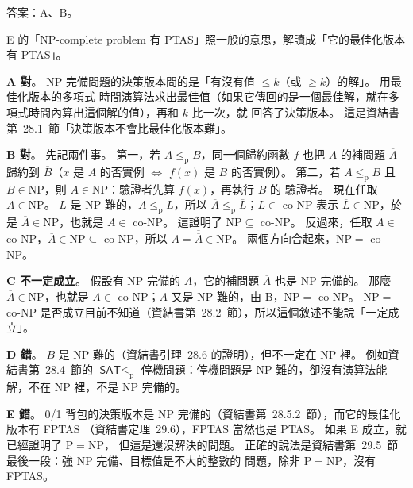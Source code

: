 \begin{pastsoln}
答案：A、B。

E 的「NP-complete problem 有 PTAS」照一般的意思，解讀成「它的最佳化版本有 PTAS」。

\textbf{A 對}。 NP 完備問題的決策版本問的是「有沒有值 $\le k$（或 $\ge k$）的解」。 用最佳化版本的多項式
時間演算法求出最佳值（如果它傳回的是一個最佳解，就在多項式時間內算出這個解的值），再和 $k$ 比一次，就
回答了決策版本。 這是資結書第~28.1~節「決策版本不會比最佳化版本難」。

\textbf{B 對}。 先記兩件事。 第一，若 $A \le_{\mathrm{p}} B$，同一個歸約函數 $f$ 也把 $A$ 的補問題
$\overline{A}$ 歸約到 $\overline{B}$（$x$ 是 $A$ 的否實例 $\iff$ $f(x)$ 是 $B$ 的否實例）。 第二，若
$A \le_{\mathrm{p}} B$ 且 $B \in \mathrm{NP}$，則 $A \in \mathrm{NP}$：驗證者先算 $f(x)$，再執行 $B$ 的
驗證者。 現在任取 $A \in \mathrm{NP}$。 $L$ 是 NP 難的，$A \le_{\mathrm{p}} L$，所以
$\overline{A} \le_{\mathrm{p}} \overline{L}$；$L \in$ co-NP 表示 $\overline{L} \in \mathrm{NP}$，於是
$\overline{A} \in \mathrm{NP}$，也就是 $A \in$ co-NP。 這證明了 $\mathrm{NP} \subseteq$ co-NP。
反過來，任取 $A \in$ co-NP，$\overline{A} \in \mathrm{NP} \subseteq$ co-NP，所以
$A = \overline{\overline{A}} \in \mathrm{NP}$。 兩個方向合起來，$\mathrm{NP} =$ co-NP。

\textbf{C 不一定成立}。 假設有 NP 完備的 $A$，它的補問題 $\overline{A}$ 也是 NP 完備的。 那麼
$\overline{A} \in \mathrm{NP}$，也就是 $A \in$ co-NP；$A$ 又是 NP 難的，由 B，$\mathrm{NP} =$ co-NP。
$\mathrm{NP} =$ co-NP 是否成立目前不知道（資結書第~28.2~節），所以這個敘述不能說「一定成立」。

\textbf{D 錯}。 $B$ 是 NP 難的（資結書引理~28.6 的證明），但不一定在 NP 裡。 例如資結書第~28.4~節的
$\textsf{SAT} \le_{\mathrm{p}}$ 停機問題：停機問題是 NP 難的，卻沒有演算法能解，不在 NP 裡，不是
NP 完備的。

\textbf{E 錯}。 0/1 背包的決策版本是 NP 完備的（資結書第~28.5.2~節），而它的最佳化版本有 FPTAS
（資結書定理~29.6），FPTAS 當然也是 PTAS。 如果 E 成立，就已經證明了 $\mathrm{P} = \mathrm{NP}$，
但這是還沒解決的問題。 正確的說法是資結書第~29.5~節最後一段：強 NP 完備、目標值是不大的整數的
問題，除非 $\mathrm{P} = \mathrm{NP}$，沒有 FPTAS。
\end{pastsoln}
